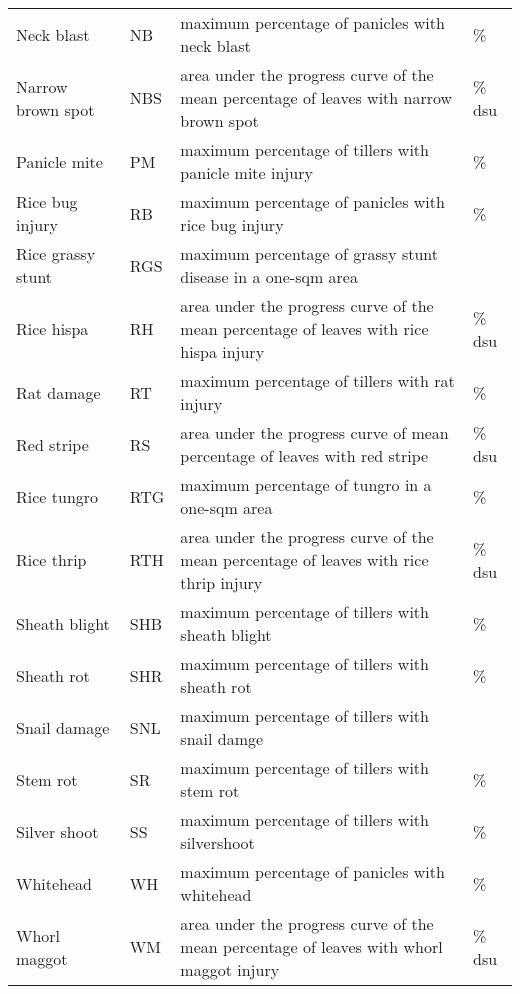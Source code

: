\begin{table}[]
\begin{tabular}{llll}
Neck blast            & NB      & maximum percentage of panicles with neck blast                                            & \%     \\
Narrow brown spot     & NBS     & area under the progress curve of the mean percentage of leaves with narrow brown spot     & \% dsu \\
Panicle mite          & PM      & maximum percentage of tillers with panicle mite injury                                    & \%     \\
Rice bug injury       & RB      & maximum percentage of panicles with rice bug injury                                       & \%     \\
Rice grassy stunt     & RGS     & maximum percentage of grassy stunt disease in a one-sqm area                              &        \\
Rice hispa            & RH      & area under the progress curve of the mean percentage of leaves with rice hispa injury     & \% dsu \\
Rat damage            & RT      & maximum percentage of tillers with rat injury                                             & \%     \\
Red stripe            & RS      & area under the progress curve of mean percentage of leaves with red stripe                & \% dsu \\
Rice tungro           & RTG     & maximum percentage of tungro in a one-sqm area                                            & \%     \\
Rice thrip            & RTH     & area under the progress curve of the mean percentage of leaves with rice thrip injury     & \% dsu \\
Sheath blight         & SHB     & maximum percentage of tillers with sheath blight                                          & \%     \\
Sheath rot            & SHR     & maximum percentage of tillers with sheath rot                                             & \%     \\
Snail damage          & SNL     & maximum percentage of tillers with snail damge                                            &        \\
Stem rot              & SR      & maximum percentage of tillers with stem rot                                               & \%     \\
Silver shoot          & SS      & maximum percentage of tillers with silvershoot                                            & \%     \\
Whitehead             & WH      & maximum percentage of panicles with whitehead                                             & \%     \\
Whorl maggot          & WM      & area under the progress curve of the mean percentage of leaves with whorl maggot injury   & \% dsu
\end{tabular}
\end{table}